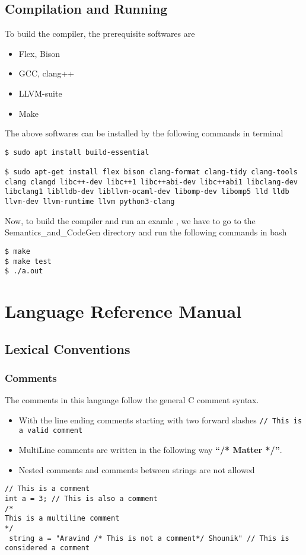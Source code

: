 \documentclass[english,a4paper,12pt]{report}
\begin{document}
\section{Compilation and Running}
To build the compiler, the prerequisite softwares are
\begin{itemize}
    \item Flex, Bison
    \item GCC, clang++
    \item LLVM-suite
    \item Make
\end{itemize}
The above softwares can be installed by the following commands in terminal
\begin{lstlisting}
$ sudo apt install build-essential

$ sudo apt-get install flex bison clang-format clang-tidy clang-tools clang clangd libc++-dev libc++1 libc++abi-dev libc++abi1 libclang-dev libclang1 liblldb-dev libllvm-ocaml-dev libomp-dev libomp5 lld lldb llvm-dev llvm-runtime llvm python3-clang
\end{lstlisting}
Now, to build the compiler and run an examle , we have to go to the Semantics\_and\_CodeGen directory and run the 
following commands in bash
\begin{lstlisting}
$ make
$ make test
$ ./a.out 
\end{lstlisting}

\chapter{Language Reference Manual}
\section{Lexical Conventions}
\subsection{Comments}
The comments in this language follow the general C comment syntax.
\begin{itemize}
    \item With the line ending comments starting with two forward slashes   
    \lstinline{// This is a valid comment}
    \item MultiLine comments are written in the following way \textbf{“/*  Matter */”}.
    \item Nested comments and comments between strings are not allowed
\end{itemize}
\begin{lstlisting}[style=CStyle]
// This is a comment
int a = 3; // This is also a comment
/* 
This is a multiline comment
*/
 string a = "Aravind /* This is not a comment*/ Shounik" // This is considered a comment
\end{lstlisting}
\end{document}

